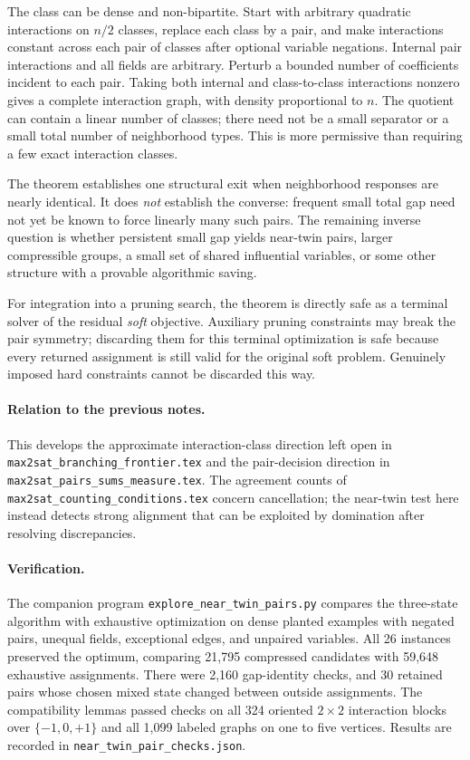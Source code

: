 \documentclass[11pt,a4paper]{article}
\begin{document}
The class can be dense and non-bipartite. Start with arbitrary quadratic
interactions on $n/2$ classes, replace each class by a pair, and make
interactions constant across each pair of classes after optional variable
negations. Internal pair interactions and all fields are arbitrary.
Perturb a bounded number of coefficients incident to each pair. Taking
both internal and class-to-class interactions nonzero gives a complete interaction
graph, with density proportional to $n$. The quotient can contain a
linear number of classes; there need not be a small separator or a small
total number of neighborhood types. This is more permissive than
requiring a few exact interaction classes.

The theorem establishes one structural exit when neighborhood responses
are nearly identical. It does \emph{not} establish the converse:
frequent small total gap need not yet be known to force linearly many
such pairs. The remaining inverse question is whether persistent small
gap yields near-twin pairs, larger compressible groups, a small set of
shared influential variables, or some other structure with a provable
algorithmic saving.

For integration into a pruning search, the theorem is directly safe as
a terminal solver of the residual \emph{soft} objective. Auxiliary
pruning constraints may break the pair symmetry; discarding them for
this terminal optimization is safe because every returned assignment is
still valid for the original soft problem. Genuinely imposed hard
constraints cannot be discarded this way.

\begingroup\small\raggedright
\paragraph{Relation to the previous notes.}
This develops the approximate interaction-class direction left open in
\texttt{max2sat\_branching\_frontier.tex} and the pair-decision direction
in \texttt{max2sat\_pairs\_sums\_measure.tex}. The agreement counts of
\texttt{max2sat\_counting\_conditions.tex} concern cancellation; the
near-twin test here instead detects strong alignment that can be
exploited by domination after resolving discrepancies.

\paragraph{Verification.}
The companion program \texttt{explore\_near\_twin\_pairs.py} compares
the three-state algorithm with exhaustive optimization on dense planted
examples with negated pairs, unequal fields, exceptional edges, and
unpaired variables. All 26 instances preserved the optimum, comparing
21,795 compressed candidates with 59,648 exhaustive assignments.
There were 2,160 gap-identity checks, and 30 retained pairs whose chosen
mixed state changed between outside assignments. The compatibility
lemmas passed checks on all 324 oriented $2\times2$ interaction blocks
over $\{-1,0,+1\}$ and all 1,099 labeled graphs on one to five vertices.
Results are recorded in \texttt{near\_twin\_pair\_checks.json}.
\par\endgroup
\end{document}
